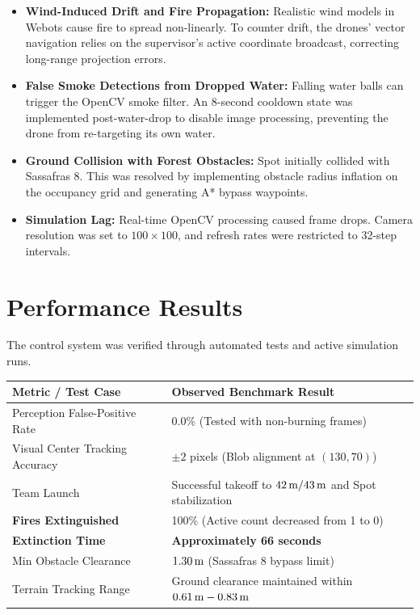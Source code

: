 \documentclass[11pt,a4paper]{article}
\begin{document}
\begin{itemize}
  \item \textbf{Wind-Induced Drift and Fire Propagation:} Realistic wind models in Webots cause fire to spread non-linearly. To counter drift, the drones' vector navigation relies on the supervisor's active coordinate broadcast, correcting long-range projection errors.
  \item \textbf{False Smoke Detections from Dropped Water:} Falling water balls can trigger the OpenCV smoke filter. An 8-second cooldown state was implemented post-water-drop to disable image processing, preventing the drone from re-targeting its own water.
  \item \textbf{Ground Collision with Forest Obstacles:} Spot initially collided with Sassafras 8. This was resolved by implementing obstacle radius inflation on the occupancy grid and generating A* bypass waypoints.
  \item \textbf{Simulation Lag:} Real-time OpenCV processing caused frame drops. Camera resolution was set to $100\times100$, and refresh rates were restricted to 32-step intervals.
\end{itemize}

\section{Performance Results}

The control system was verified through automated tests and active simulation runs.

\begin{center}
\small\renewcommand{\arraystretch}{1.05}
\begin{tabular}{p{5.2cm} p{9.8cm}}
\toprule
\textbf{Metric / Test Case} & \textbf{Observed Benchmark Result} \\
\midrule
Perception False-Positive Rate & 0.0\% (Tested with non-burning frames) \\
Visual Center Tracking Accuracy & $\pm 2$ pixels (Blob alignment at $(130, 70)$) \\
Team Launch & Successful takeoff to $42\text{\,m}/43\text{\,m}$ and Spot stabilization \\
\textbf{Fires Extinguished} & 100\% (Active count decreased from 1 to 0) \\
\textbf{Extinction Time} & \textbf{Approximately 66 seconds} \\
Min Obstacle Clearance & $1.30\text{\,m}$ (Sassafras 8 bypass limit) \\
Terrain Tracking Range & Ground clearance maintained within $0.61\text{\,m} - 0.83\text{\,m}$ \\
\bottomrule
\end{tabular}
\end{center}
\end{document}
